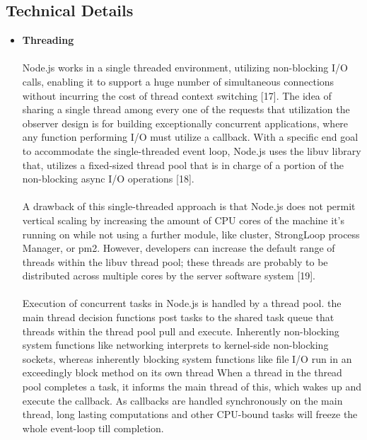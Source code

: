 \documentclass[a4paper, onecolumn, oneside, 11pt, wide, floatssmall]{mwrep}
\begin{document}
\subsection{Technical Details}
\begin{itemize}
    \item \textbf{Threading}
    \paragraph{}
    Node.js works in a single threaded environment, utilizing non-blocking I/O calls, enabling it to support a huge number of simultaneous connections without incurring the cost of thread context switching [17]. The idea of sharing a single thread among every one of the requests that utilization the observer design is for building exceptionally concurrent applications, where any function performing I/O must utilize a callback. With a specific end goal to accommodate the single-threaded event loop, Node.js uses the libuv library that, utilizes a fixed-sized thread pool that is in charge of a portion of the non-blocking async I/O operations [18].
    \paragraph{}
    A drawback of this single-threaded approach is that Node.js does not permit vertical scaling by increasing the amount of CPU cores of the machine it's running on while not using a further module, like cluster, StrongLoop process Manager, or pm2. However, developers can increase the default range of threads within the libuv thread pool; these threads are probably to be distributed across multiple cores by the server software system [19].
    \paragraph{}
    Execution of concurrent tasks in Node.js is handled by a thread pool. the main thread decision functions post tasks to the shared task queue that threads within the thread pool pull and execute. Inherently non-blocking system functions like networking interprets to kernel-side non-blocking sockets, whereas inherently blocking system functions like file I/O run in an exceedingly block method on its own thread When a thread in the thread pool completes a task, it informs the main thread of this, which wakes up and execute the callback. As callbacks are handled synchronously on the main thread, long lasting computations and other CPU-bound tasks will freeze the whole event-loop till completion.

\end{itemize}
\end{document}
